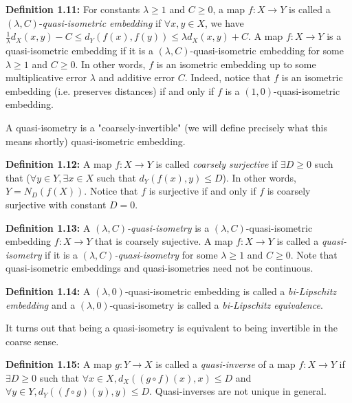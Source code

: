 \documentclass[12pt]{article}
\newcommand{\vs}{\vskip10pt}
\begin{document}
	\vs 
	
	\textbf{Definition 1.11: } For constants $\lambda \geq 1$ and $C \geq 0$, a map $f: X \rightarrow Y$ is called a $(\lambda, C)$-\textit{quasi-isometric embedding} if $\forall x,y \in X$, we have $\frac{1}{\lambda} d_X(x,y) - C \leq d_Y(f(x), f(y)) \leq \lambda d_X(x,y) + C$. A map $f: X \rightarrow Y$ is a quasi-isometric embedding if it is a $(\lambda, C)$-quasi-isometric embedding for some $\lambda \geq 1$ and $C \geq 0$. In other words, $f$ is an isometric embedding up to some multiplicative error $\lambda$ and additive error $C$. Indeed, notice that $f$ is an isometric embedding (i.e. preserves distances) if and only if $f$ is a $(1, 0)$-quasi-isometric embedding. 
	
	\vs 
	
	A quasi-isometry is a "coarsely-invertible" (we will define precisely what this means shortly) quasi-isometric embedding. 
	
	\vs 
	
	\textbf{Definition 1.12: } A map $f: X \rightarrow Y$ is called \textit{coarsely surjective} if $\exists D \geq 0$ such that ($\forall y \in Y, \exists x \in X$ such that $d_Y(f(x), y) \leq D$). In other words, $Y = N_D(f(X))$. Notice that $f$ is surjective if and only if $f$ is coarsely surjective with constant $D = 0$. 
	
	\vs 
	
	\textbf{Definition 1.13: } A $(\lambda, C)$\textit{-quasi-isometry} is a $(\lambda, C)$-quasi-isometric embedding $f: X \rightarrow Y$ that is coarsely sujective. A map $f: X \rightarrow Y$ is called a \textit{quasi-isometry} if it is a $(\lambda, C)$\textit{-quasi-isometry} for some $\lambda \geq 1$ and $C \geq 0$. Note that quasi-isometric embeddings and quasi-isometries need not be continuous. 
	
	\vs 
	
	\textbf{Definition 1.14: } A $(\lambda, 0)$-quasi-isometric embedding is called a \textit{bi-Lipschitz embedding} and a $(\lambda, 0)$-quasi-isometry is called a \textit{bi-Lipschitz equivalence}.
	
	\vs 
	
	It turns out that being a quasi-isometry is equivalent to being invertible in the coarse sense. 
	
	\vs 
	
	\textbf{Definition 1.15: } A map $g: Y \rightarrow X$ is called a \textit{quasi-inverse} of a map $f: X \rightarrow Y$ if $\exists D \geq 0$ such that $\forall x \in X, d_X((g \circ f)(x), x) \leq D$ and $\forall y \in Y, d_Y((f \circ g) (y), y) \leq D$. Quasi-inverses are not unique in general.
	
\end{document}
